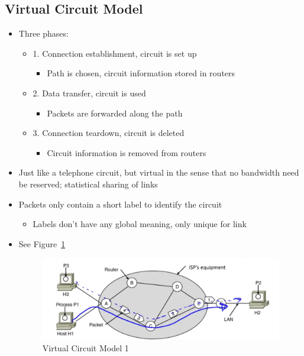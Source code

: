 \documentclass[12pt]{ctexart}   %
\begin{document}
	\subsection{Virtual Circuit Model}
	\begin{itemize}
		\item Three phases:
		\begin{itemize}
			\item {\color{blue} 1.} Connection establishment, circuit is set up
			\begin{itemize}
				\item Path is chosen, circuit information stored in routers
			\end{itemize}
			\item {\color{blue} 2.} Data transfer, circuit is used
			\begin{itemize}
				\item Packets are forwarded along the path
			\end{itemize}
			\item {\color{blue} 3.} Connection teardown, circuit is deleted
			\begin{itemize}
				\item Circuit information is removed from routers
			\end{itemize}
		\end{itemize}
		
		\item Just like a telephone circuit, but virtual in the sense that no bandwidth need be reserved; statistical sharing of links
		
		\item Packets only contain a short label to identify the circuit
		\begin{itemize}
			\item Labels don't have any global meaning, only unique for link
		\end{itemize}
		\item See Figure~\ref{fig:4-2-6}
		
		\begin{figure}[h!] %
		\centering
		 \includegraphics[scale=0.7]{images/4-2-6}
		\caption{ Virtual Circuit Model 1 }
		 \label{fig:4-2-6}
		 \end{figure}
		 

\end{itemize}
\end{document}
